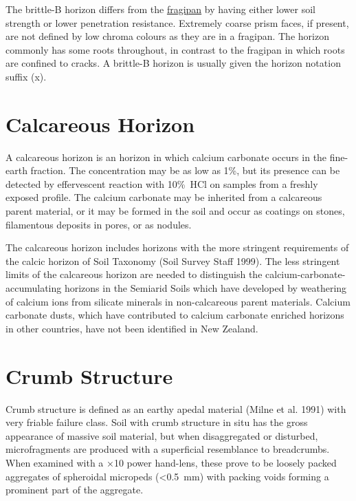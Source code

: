 \documentclass[
  letterpaper,
  DIV=11,
  numbers=noendperiod]{scrreprt}
\begin{document}
The brittle-B horizon differs from the
\protect\hyperlink{sec-diag-fpan}{fragipan} by having either lower soil
strength or lower penetration resistance. Extremely coarse prism faces,
if present, are not defined by low chroma colours as they are in a
fragipan. The horizon commonly has some roots throughout, in contrast to
the fragipan in which roots are confined to cracks. A brittle-B horizon
is usually given the horizon notation suffix (x).

\hypertarget{sec-diag-calch}{%
\section{Calcareous Horizon}\label{sec-diag-calch}}

A calcareous horizon is an horizon in which calcium carbonate occurs in
the fine-earth fraction. The concentration may be as low as 1\%, but its
presence can be detected by effervescent reaction with 10\%~HCl on
samples from a freshly exposed profile. The calcium carbonate may be
inherited from a calcareous parent material, or it may be formed in the
soil and occur as coatings on stones, filamentous deposits in pores, or
as nodules.

The calcareous horizon includes horizons with the more stringent
requirements of the calcic horizon of Soil Taxonomy (Soil Survey Staff
1999). The less stringent limits of the calcareous horizon are needed to
distinguish the calcium-carbonate-accumulating horizons in the Semiarid
Soils which have developed by weathering of calcium ions from silicate
minerals in non-calcareous parent materials. Calcium carbonate dusts,
which have contributed to calcium carbonate enriched horizons in other
countries, have not been identified in New Zealand.

\hypertarget{sec-diag-crumb}{%
\section{Crumb Structure}\label{sec-diag-crumb}}

Crumb structure is defined as an earthy apedal material (Milne et al.
1991) with very friable failure class. Soil with crumb structure in situ
has the gross appearance of massive soil material, but when
disaggregated or disturbed, microfragments are produced with a
superficial resemblance to breadcrumbs. When examined with a ×10 power
hand-lens, these prove to be loosely packed aggregates of spheroidal
micropeds (\textless0.5~mm) with packing voids forming a prominent part
of the aggregate.
\end{document}
